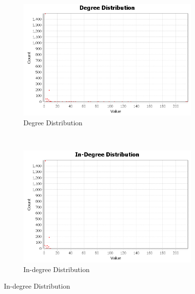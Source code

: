 \documentclass[a4paper,12pt]{article}
\begin{document}
\begin{figure}
        \centering
        \begin{subfigure}[a]{0.675\textwidth}
                \includegraphics[width=\textwidth]{degree-distribution.png}
                \caption{Degree Distribution}
               
        \end{subfigure}
        ~ %
        
        \begin{subfigure}[b]{0.675\textwidth}
                \includegraphics[width=\textwidth]{indegree-distribution.png}
                \caption{In-degree Distribution}
                
        \end{subfigure}%
        

\end{figure}
\end{document}
